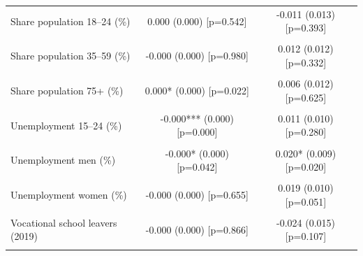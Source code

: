 \begin{table}[!h]
\begin{tabular}{lcc}
Share population 18–24 (\%) & 0.000 (0.000) [p=0.542] & -0.011 (0.013) [p=0.393]\\
\cellcolor{gray!10}{Share population 25–34 (\%)} & \cellcolor{gray!10}{-0.000 (0.000) [p=0.683]} & \cellcolor{gray!10}{0.002 (0.006) [p=0.757]}\\
\addlinespace
Share population 35–59 (\%) & -0.000 (0.000) [p=0.980] & 0.012 (0.012) [p=0.332]\\
\cellcolor{gray!10}{Share population 60–74 (\%)} & \cellcolor{gray!10}{-0.000 (0.000) [p=0.466]} & \cellcolor{gray!10}{0.003 (0.008) [p=0.718]}\\
Share population 75+ (\%) & 0.000* (0.000) [p=0.022] & 0.006 (0.012) [p=0.625]\\
\cellcolor{gray!10}{Share population <18 (\%)} & \cellcolor{gray!10}{0.000 (0.000) [p=0.861]} & \cellcolor{gray!10}{-0.033* (0.015) [p=0.026]}\\
Unemployment 15–24 (\%) & -0.000*** (0.000) [p=0.000] & 0.011 (0.010) [p=0.280]\\
\addlinespace
\cellcolor{gray!10}{Unemployment 55–64 (\%)} & \cellcolor{gray!10}{0.000 (0.000) [p=0.235]} & \cellcolor{gray!10}{0.023* (0.009) [p=0.014]}\\
Unemployment men (\%) & -0.000* (0.000) [p=0.042] & 0.020* (0.009) [p=0.020]\\
\cellcolor{gray!10}{Unemployment total (\%)} & \cellcolor{gray!10}{0.000 (0.000) [p=0.317]} & \cellcolor{gray!10}{0.021* (0.009) [p=0.030]}\\
Unemployment women (\%) & -0.000 (0.000) [p=0.655] & 0.019 (0.010) [p=0.051]\\
\cellcolor{gray!10}{Upper-sec / university entrance (\%)} & \cellcolor{gray!10}{-0.000 (0.000) [p=0.485]} & \cellcolor{gray!10}{0.001 (0.002) [p=0.714]}\\
\addlinespace
Vocational school leavers (2019) & -0.000 (0.000) [p=0.866] & -0.024 (0.015) [p=0.107]\\
\cellcolor{gray!10}{econ_lr_score} & \cellcolor{gray!10}{NA} & \cellcolor{gray!10}{0.001*** (0.000) [p=0.001]}\\
\bottomrule
\end{tabular}
\end{table}
